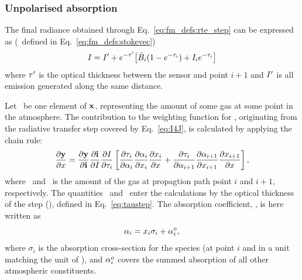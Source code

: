 \subsubsection{Unpolarised absorption}
%
The final radiance obtained through Eq.~\ref{eq:fm_defs:rte_step} can be
expressed as (\StoI\ defined in Eq.~\ref{eq:fm_defs:stokevec})
\begin{equation}
  \label{eq:I4J}
  I = I'+ e^{-\tau'}\!\left[ \bar{B}_i(1-e^{-\tau_{i}}) + 
                                         I_{i}e^{-\tau_{i}} \right]
\end{equation}
where $\tau'$ is the optical thickness between the sensor and point $i+1$ and
$I'$ is all emission generated along the same distance.

Let \SttElm\ be one element of $\mathbf{x}$, representing the amount of
some gas at some point in the atmosphere. The contribution to the weighting
function for \SttElm, originating from the radiative transfer step covered by
Eq.~\ref{eq:I4J}, is calculated by applying the chain rule:
\begin{equation}
  \label{eq:chainrule1}
  \frac{\partial\mathbf{y}}{\partial x} =  
  \frac{\partial\mathbf{y}}{\partial\mathbf{i}}
  \frac{\partial\mathbf{i}}{\partial I} 
  \frac{\partial I}{\partial\tau_{i}}
  \left[ \frac{\partial\tau_{i}}{\partial{\alpha}_{i}}
         \frac{\partial{\alpha}_{i}}{\partial x_{i}} 
         \frac{\partial x_{i}}{\partial x} +
         \frac{\partial\tau_{i}}{\partial{\alpha}_{i+1}}
         \frac{\partial{\alpha}_{i+1}}{\partial x_{i+1}}
         \frac{\partial x_{i+1}}{\partial x} 
  \right],
\end{equation}
where \ and \ is the amount of the gas at propagtion
path point $i$ and $i+1$, respectively. The quantities \ and
\ enter the calculations by the optical thickness of the step
(), defined in Eq.~\ref{eq:taustep}. The absorption coefficient,
, is here written as
\begin{equation}
  \label{eq:wfuns:crossec1}
  {\alpha}_{i} = x_{i}\sigma_i + {\alpha}_{i}^o,
\end{equation}
where $\sigma_i$ is the absorption cross-section for the species (at point $i$
and in a unit matching the unit of \SttElm), and ${\alpha}_{i}^o$ covers the
summed absorption of all other atmospheric constituents.

